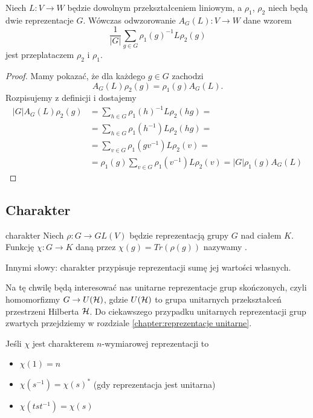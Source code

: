 \begin{lemma}{}{}
  Niech $L:V\to W$ będzie dowolnym przekształceniem liniowym, a $\rho_1$, $\rho_2$ niech będą dwie reprezentacje $G$. Wówczas odwzorowanie $A_G(L):V\to W$ dane wzorem
  $$\frac{1}{|G|}\sum_{g\in G}\rho_1(g)^{-1}L\rho_2(g)$$
  jest przeplataczem $\rho_2$ i $\rho_1$.
\end{lemma}

\begin{proof}
  Mamy pokazać, że dla każdego $g\in G$ zachodzi
  $$A_G(L)\rho_2(g)=\rho_1(g)A_G(L).$$
  Rozpisujemy z definicji i dostajemy
  \begin{align*}
    |G|A_G(L)\rho_2(g)&=\sum_{h\in G}\rho_1(h)^{-1}L\rho_2(hg)= \\ 
                      &=\sum_{h\in G}\rho_1(h^{-1})L\rho_2(hg)= \\ 
                      &=\sum_{v\in G}\rho_1(gv^{-1})L\rho_2(v)= \\ 
                      &=\rho_1(g)\sum_{v\in G}\rho_1(v^{-1})L\rho_2(v)=|G|\rho_1(g)A_G(L)
  \end{align*}
\end{proof}

\subsection{Charakter}

\begin{definition}{charakter}{}
  Niech $\rho:G\to GL(V)$ będzie reprezentacją grupy $G$ nad ciałem $K$. Funkcję $\chi:G\to K$ daną przez $\chi(g)=Tr(\rho(g))$ nazywamy .
\end{definition}

Innymi słowy: charakter przypisuje reprezentacji sumę jej wartości własnych.

Na tę chwilę będą interesować nas unitarne reprezentacje grup skończonych, czyli homomorfizmy $G\to U(\operatorname{\mathcal{H}})$, gdzie $U(\operatorname{\mathcal{H}})$ to grupa unitarnych przekształceń przestrzeni Hilberta $\operatorname{\mathcal{H}}$. Do ciekawszego przypadku unitarnych reprezentacji grup zwartych przejdziemy w rozdziale \ref{chapter:reprezentacje unitarne}.

\begin{fact}{}{}
  Jeśli $\chi$ jest charakterem $n$-wymiarowej reprezentacji to
  \begin{itemize}
    \item $\chi(1)=n$
    \item $\chi(s^{-1})=\chi(s)^*$ (gdy reprezentacja jest unitarna)
    \item $\chi(tst^{-1})=\chi(s)$
  \end{itemize}
\end{fact}

